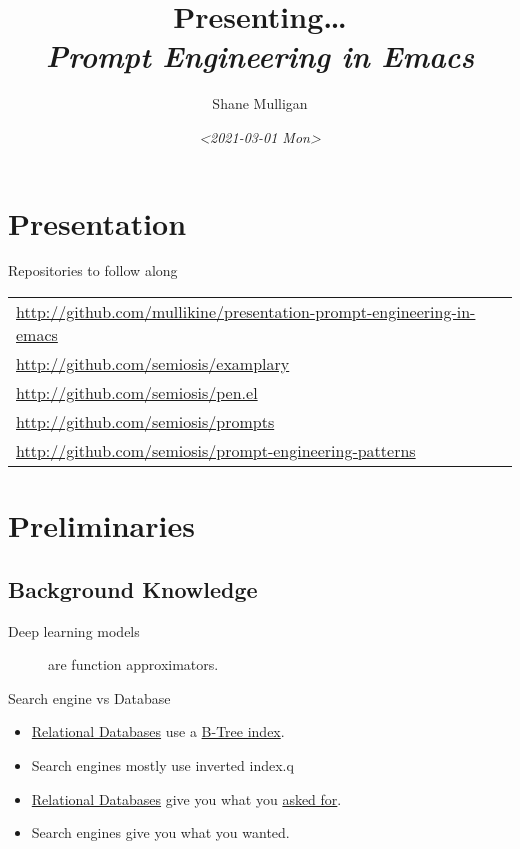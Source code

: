 \documentclass[presentation]{beamer}
\author{Shane Mulligan \\  }
\date{\textit{<2021-03-01 Mon>}}
\title{Presenting\ldots{} \\   \emph{\alert{Prompt Engineering in Emacs}} \\  }
\begin{document}
\maketitle

\section{Presentation}
\label{sec:orga94013c}
\begin{frame}[label={sec:org368bb12}]{Repositories to follow along}
{\footnotesize
\begin{center}
\begin{tabular}{l}
\url{http://github.com/mullikine/presentation-prompt-engineering-in-emacs}\\
\url{http://github.com/semiosis/examplary}\\
\url{http://github.com/semiosis/pen.el}\\
\url{http://github.com/semiosis/prompts}\\
\url{http://github.com/semiosis/prompt-engineering-patterns}\\
\end{tabular}
\end{center}
}
\end{frame}

\section{Preliminaries}
\label{sec:org512bc28}
\subsection{Background Knowledge}
\label{sec:orge02ca84}
\begin{description}
\item[{Deep learning models}] are function approximators.
\end{description}

\begin{frame}[label={sec:orgfa57dfc}]{Search engine vs Database}
\begin{itemize}
\item \uline{Relational Databases} use a \uline{B-Tree index}.
\item \alert{Search engines} mostly use \alert{inverted index}.q
\item \uline{Relational Databases} give you what you \uline{asked for}.
\item \alert{Search engines} give you what you \alert{wanted}.
\end{itemize}
\end{frame}
\end{document}
